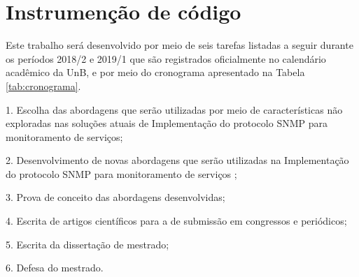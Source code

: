 

\section{Instrumenção de código}

Este trabalho será desenvolvido por meio de seis tarefas listadas a seguir durante os períodos 2018/2 e 2019/1 que são registrados oficialmente no calendário acadêmico da UnB, e por meio do cronograma apresentado na Tabela \ref{tab:cronograma}.

	1. Escolha das abordagens que serão utilizadas por meio de características não exploradas nas soluções atuais de Implementação do protocolo SNMP para monitoramento de serviços;
  
  2. Desenvolvimento de novas abordagens que serão utilizadas na Implementação do protocolo SNMP para monitoramento de serviços ;
    
  3. Prova de conceito das abordagens desenvolvidas;
    
  4. Escrita de artigos científicos para a de submissão em congressos e periódicos;
  
  5. Escrita da dissertação de mestrado;
  
  6. Defesa do mestrado.

